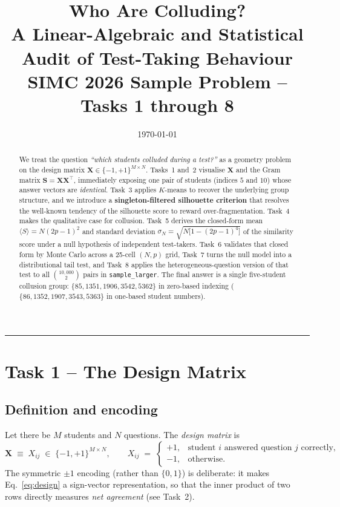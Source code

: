 \documentclass[11pt,a4paper]{article}
\title{\bfseries Who Are Colluding? \\
       \large A Linear-Algebraic and Statistical Audit of Test-Taking Behaviour \\
       \normalsize SIMC 2026 Sample Problem -- Tasks 1 through 8}
\author{}
\date{\today}
\newcommand{\X}{\bm{X}}
\newcommand{\Sm}{\bm{S}}
\begin{document}
\maketitle

\begin{abstract}
We treat the question \emph{``which students colluded during a test?''} as a
geometry problem on the design matrix $\X\in\{-1,+1\}^{M\times N}$. Tasks~1
and~2 visualise $\X$ and the Gram matrix $\Sm = \X\X^{\!\top}$, immediately
exposing one pair of students (indices $5$ and $10$) whose answer vectors
are \emph{identical}. Task~3 applies $K$-means to recover the underlying
group structure, and we introduce a \textbf{singleton-filtered silhouette
criterion} that resolves the well-known tendency of the silhouette score
to reward over-fragmentation. Task~4 makes the qualitative case for
collusion. Task~5 derives the closed-form mean
$\langle S\rangle = N(2p-1)^2$ and standard deviation
$\sigma_N = \sqrt{N\bigl[1 - (2p-1)^4\bigr]}$ of the similarity score under
a null hypothesis of independent test-takers. Task~6 validates that closed
form by Monte Carlo across a 25-cell $(N,p)$ grid, Task~7 turns the null
model into a distributional tail test, and Task~8 applies the
heterogeneous-question version of that test to all
$\binom{10{,}000}{2}$ pairs in \texttt{sample\_larger}. The final answer
is a single five-student collusion group:
$\{85,1351,1906,3542,5362\}$ in zero-based indexing
($\{86,1352,1907,3543,5363\}$ in one-based student numbers).
\end{abstract}

\tableofcontents
\vspace{1em}\hrule\vspace{1em}

\section{Task 1 -- The Design Matrix}

\subsection{Definition and encoding}
Let there be $M$ students and $N$ questions. The \emph{design matrix} is
\begin{equation}
  \X \;\equiv\; X_{ij} \;\in\; \{-1,+1\}^{M\times N},
  \qquad
  X_{ij} \;=\;
  \begin{cases}
    +1, & \text{student $i$ answered question $j$ correctly,}\\
    -1, & \text{otherwise.}
  \end{cases}
  \label{eq:design}
\end{equation}
The symmetric $\pm 1$ encoding (rather than $\{0,1\}$) is deliberate: it
makes Eq.~\eqref{eq:design} a sign-vector representation, so that the
inner product of two rows directly measures \emph{net agreement} (see
Task~2).
\end{document}
